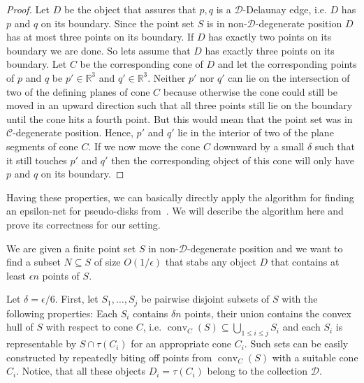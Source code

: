 \documentclass{stacs_proc}
\newcommand{\bigO}{O}
\newcommand{\setR}{\mathbb{R}}
\newcommand{\D}{\mathcal{D}}
\newcommand{\C}{\mathcal{C}}
\DeclareMathOperator{\con}{conv}
\begin{document}
\begin{proof}
  Let $D$ be the object that assures that ${p, q}$ is a $\D$-Delaunay
  edge, i.e. $D$ has $p$ and $q$ on its boundary. Since the point set
  $S$ is in non-$\D$-degenerate position $D$ has at most three points
  on its boundary. If $D$ has exactly two points on its boundary we
  are done. So lets assume that $D$ has exactly three points on its
  boundary. Let $C$ be the corresponding cone of $D$ and let the
  corresponding points of $p$ and $q$ be $p'\in \setR^3$ and $q'\in \setR^3$.  
  Neither $p'$ nor $q'$ can lie on the intersection of two of the
  defining planes of cone $C$ because otherwise the cone could still
  be moved in an upward direction such that all three points still lie
  on the boundary until the cone hits a fourth point. But this would
  mean that the point set was in $\C$-degenerate position. Hence, $p'$
  and $q'$ lie in the interior of two of the plane segments of cone
  $C$.  
  If we now move the cone $C$ downward by a small $\delta$ such that it
  still touches $p'$ and $q'$ then the corresponding object of this
  cone will only have $p$ and $q$ on its boundary.  
\end{proof}


Having these properties, we can basically directly apply the algorithm
for finding an epsilon-net for pseudo-disks  
from~\cite{MSW90}. We will describe the algorithm here and prove its
correctness for our setting. 

We are given a finite point set $S$ in non-$\D$-degenerate position
and we want to find a subset $N\subseteq S$ of size $\bigO(1/ \epsilon)$ that stabs
any object $D$ that contains at least $\epsilon n$ points of $S$. 

Let $\delta=\epsilon/6$. First, let $S_1, \ldots, S_j$ be pairwise disjoint subsets of
$S$ with the following properties: Each $S_i$ contains $\delta n$ points,
their union contains the convex hull of $S$ with respect to cone $C$,
i.e. $\con_C(S)\subseteq \bigcup_{1\leq i\leq j} S_i$ and each $S_i$ is representable by
$S\cap \tau(C_i)$ for an appropriate  cone $C_i$. Such sets can be easily
constructed by repeatedly biting off points from $\con_C(S)$ with a
suitable cone $C_i$. Notice, that all these objects $D_i=\tau(C_i)$
belong to the collection $\D$.  
\end{document}
